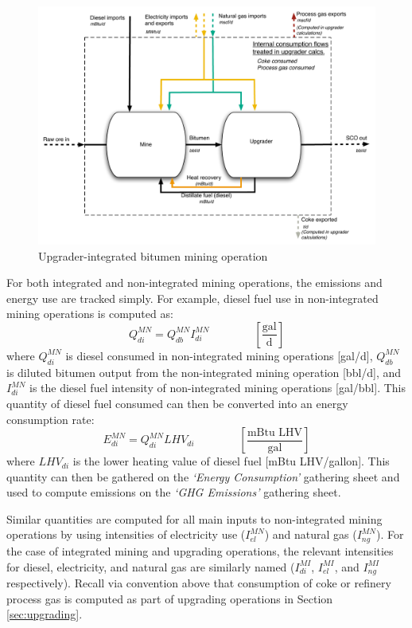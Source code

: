 \documentclass[11pt]{report}
\newcommand{\sheet}[1]{\textit{`{#1}'}}
\newcommand{\eqnunitfrac}[2]{\quad\quad \scriptstyle{\left[\frac{\text{#1}}{\text{#2}}\right]}}
\begin{document}
\begin{figure}[t]
\includegraphics[width=1\columnwidth]{images/Mining_Int.pdf}
\caption{Upgrader-integrated bitumen mining operation}
\label{fig:pfd_mining_int}
\end{figure}

For both integrated and non-integrated mining operations, the emissions and energy use are tracked simply.  For example, diesel fuel use in non-integrated mining operations is computed as:
\begin{equation}\label{eq:dieselmine}
Q_{di}^{MN} = Q_{db}^{MN} I_{di}^{MN} \quad\quad\eqnunitfrac{gal}{d}
\end{equation}
where $Q_{di}^{MN}$ is diesel consumed in non-integrated mining operations [gal/d], $Q_{db}^{MN}$ is diluted bitumen output from the non-integrated mining operation [bbl/d], and $I_{di}^{MN}$ is the diesel fuel intensity of non-integrated mining operations [gal/bbl].  This quantity of diesel fuel consumed can then be converted into an energy consumption rate:
\begin{equation}
E_{di}^{MN} = Q_{di}^{MN} LHV_{di} \quad\quad\eqnunitfrac{mBtu LHV}{gal}
\end{equation}
where $LHV_{di}$ is the lower heating value of diesel fuel [mBtu LHV/gallon].  This quantity can then be gathered on the \sheet{Energy Consumption} gathering sheet and used to compute emissions on the \sheet{GHG Emissions} gathering sheet.

Similar quantities are computed for all main inputs to non-integrated mining operations by using intensities of electricity use ($I_{el}^{MN}$) and natural gas ($I_{ng}^{MN}$).  For the case of integrated mining and upgrading operations, the relevant intensities for diesel, electricity, and natural gas are similarly named ($I_{di}^{MI}$, $I_{el}^{MI}$, and $I_{ng}^{MI}$ respectively). Recall via convention above that consumption of coke or refinery process gas is computed as part of upgrading operations in Section \ref{sec:upgrading}.
\end{document}

